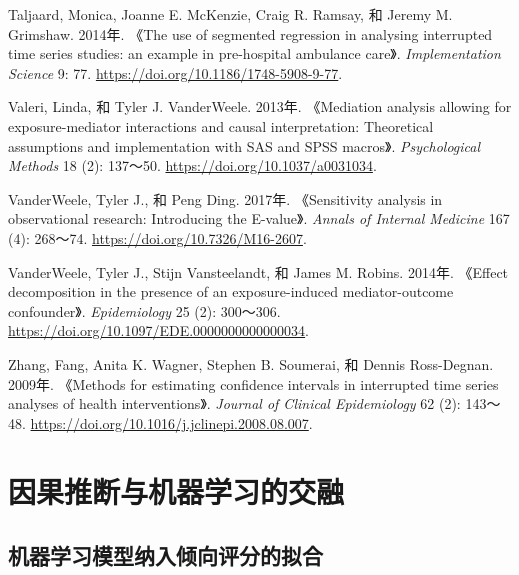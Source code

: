 \documentclass[
  chinese-hans,
  letterpaper,
  DIV=11,
  numbers=noendperiod]{scrreprt}
\newlength{\cslhangindent}
\newenvironment{CSLReferences}[2] %
 {\begin{list}{}{%
  \setlength{\itemindent}{0pt}
  \setlength{\leftmargin}{0pt}
  \setlength{\parsep}{0pt}
  \ifodd #1
   \setlength{\leftmargin}{\cslhangindent}
   \setlength{\itemindent}{-1\cslhangindent}
  \fi
  \setlength{\itemsep}{#2\baselineskip}}}
 {\end{list}}
\begin{document}
\begin{CSLReferences}{1}{1}
Taljaard, Monica, Joanne E. McKenzie, Craig R. Ramsay, 和 Jeremy M.
Grimshaw. 2014年. {《The use of segmented regression in analysing
interrupted time series studies: an example in pre-hospital ambulance
care》}. \emph{Implementation Science} 9: 77.
\url{https://doi.org/10.1186/1748-5908-9-77}.

Valeri, Linda, 和 Tyler J. VanderWeele. 2013年. {《Mediation analysis
allowing for exposure-mediator interactions and causal interpretation:
Theoretical assumptions and implementation with {SAS} and {SPSS}
macros》}. \emph{Psychological Methods} 18 (2): 137～50.
\url{https://doi.org/10.1037/a0031034}.

VanderWeele, Tyler J., 和 Peng Ding. 2017年. {《Sensitivity analysis in
observational research: Introducing the {E}-value》}. \emph{Annals of
Internal Medicine} 167 (4): 268～74.
\url{https://doi.org/10.7326/M16-2607}.

VanderWeele, Tyler J., Stijn Vansteelandt, 和 James M. Robins. 2014年.
{《Effect decomposition in the presence of an exposure-induced
mediator-outcome confounder》}. \emph{Epidemiology} 25 (2): 300～306.
\url{https://doi.org/10.1097/EDE.0000000000000034}.

Zhang, Fang, Anita K. Wagner, Stephen B. Soumerai, 和 Dennis
Ross-Degnan. 2009年. {《Methods for estimating confidence intervals in
interrupted time series analyses of health interventions》}.
\emph{Journal of Clinical Epidemiology} 62 (2): 143～48.
\url{https://doi.org/10.1016/j.jclinepi.2008.08.007}.

\end{CSLReferences}


\chapter{因果推断与机器学习的交融}\label{ux56e0ux679cux63a8ux65adux4e0eux673aux5668ux5b66ux4e60ux7684ux4ea4ux878d}

\section{机器学习模型纳入倾向评分的拟合}\label{ux673aux5668ux5b66ux4e60ux6a21ux578bux7eb3ux5165ux503eux5411ux8bc4ux5206ux7684ux62dfux5408}
\end{document}
